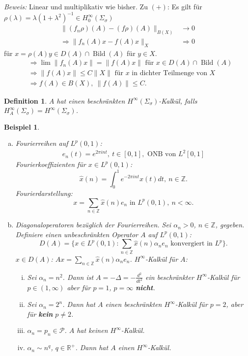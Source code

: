 \documentclass[12pt]{extreport} %
\newtheorem{Definition}[Satz]{Definition}
\newtheorem{Beispiel}[Satz]{Beispiel}
\DeclareMathOperator{\Bild}{Bild}
\numberwithin{equation}{section}
\newcommand{\R}{\mathbb{R}} %
\newcommand{\Z}{\mathbb{Z}} %
\newcommand{\Bew}{\emph{Beweis: }}
\newcommand{\laplace}{\Delta}
\begin{document}
	\Bew Linear und multiplikativ wie bisher. Zu $(+)$: Es gilt für $\rho(\lambda) = \lambda(1+\lambda^2)^{-1}\in H_0^\infty(\Sigma_\sigma)$
	\begin{align*}
		\|(f_n\rho)(A) - (f\rho)(A)\|_{B(X)} & \rightarrow 0\\
		\Rightarrow \|f_n(A)x-f(A)x\|_X& \Rightarrow 0
	\end{align*}
	für $x= \rho(A)y\in D(A)\cap\Bild(A)$ für $y\in X$.
	\begin{align*}
		&\Rightarrow \lim \|f_n(A)x\| = \|f(A)x\| \text{ für } x\in D(A)\cap \Bild(A)\\
		&\Rightarrow \|f(A)x\|\leq C\|X\| \text{ für } x\text{ in dichter Teilmenge von } X\\
		&\Rightarrow f(A)\in B(X), ~ \|f(A)\|\leq C.
	\end{align*}
	
	\begin{Definition}
		$A$ hat einen beschränkten $H^\infty(\Sigma_\sigma)$-Kalkül, falls $H_A^\infty(\Sigma_\sigma) = H^\infty(\Sigma_\sigma)$.
	\end{Definition}
	
	\begin{Beispiel}
		~
		\begin{enumerate}[a)]
			\item Fourierreihen auf $L^p(0,1)$:
			\begin{align*}
				e_n(t) = e^{2\pi int},~ t\in [0,1], \text{ ONB von } L^2[0,1]
			\end{align*}
			Fourierkoeffizienten für $x\in L^p(0,1)$: 
			$$\hat x(n) = \int_{0}^{1}e^{-2\pi int} x(t)dt,~ n \in \Z.$$
			Fourierdarstellung: 
			$$x= \sum_{n\in \Z} \hat x(n) e_n \text{ in } L^p(0,1), ~n<\infty.$$
			\item Diagonaloperatoren bezüglich der Fourierreihen. Sei $\alpha_n > 0$, $n\in \Z$, gegeben. Definiere einen unbeschränkten Operator $A$ auf $L^p(0,1)$:  
			$$D(A)=\{x\in L^p(0,1)\colon \sum_{n\in \Z}\hat x(n) \alpha_n e_n \text{ konvergiert in } L^p \}.$$
			$x\in D(A)$: $Ax= \sum_{n\in \Z} \hat x(n) \alpha_n e_n$. $H^\infty$-Kalkül für $A$:
			\begin{enumerate}[(i)]
				\item Sei $\alpha_n = n^2$. Dann ist 
				$A = -\laplace = -\frac{d^2}{dt^2}$ ein beschränkter $H^\infty$-Kalkül für $p\in (1,\infty)$ aber für $p = 1$, $p= \infty$ \textbf{nicht}.
				\item Sei $\alpha_n= 2^n$. Dann hat $A$ einen beschränkten $H^\infty$-Kalkül für $p = 2$, aber für \textbf{kein} $p\neq 2$.
				\item $\alpha_n = p_n\in \mathcal{P}$. $A$ hat keinen $H^\infty$-Kalkül.
				\item $\alpha_n\sim n^q$, $q\in \R^+$. Dann hat $A$ einen $H^\infty$-Kalkül.
			\end{enumerate}
		\end{enumerate}
	\end{Beispiel}
	
\end{document}
